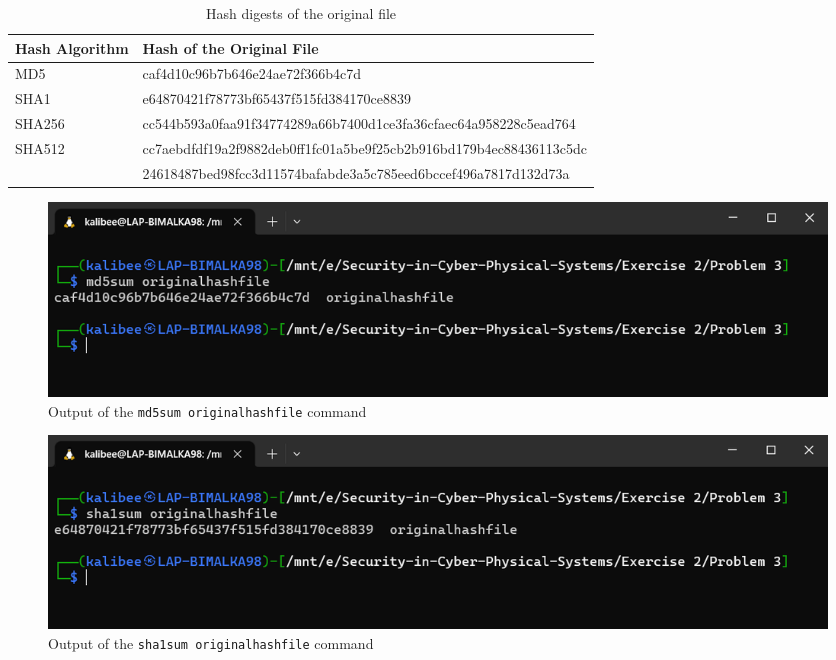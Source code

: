 \documentclass[11pt,letterpaper]{article}
\begin{document}
\begin{enumerate}
				
		
		\begin{table}[h!]
			\caption{Hash digests of the original file
			} \label{tab:hash-digest-originalhashfile}
			\begin{tabularx}{\columnwidth}{|p{4cm}|X|}
				\hline
				\textbf{Hash Algorithm} & \textbf{Hash of the Original File} \\
				\hline
				MD5 & caf4d10c96b7b646e24ae72f366b4c7d \\\hline
				
				\hline
				SHA1 & e64870421f78773bf65437f515fd384170ce8839 \\\hline
				
				\hline
				SHA256 & cc544b593a0faa91f34774289a66b7400d1ce3fa36cfaec64a958228c5ead764  \\ \hline
				
				\hline
				SHA512 & cc7aebdfdf19a2f9882deb0ff1fc01a5be9f25cb2b916bd179b4ec88436113c5dc\\ & 24618487bed98fcc3d11574bafabde3a5c785eed6bccef496a7817d132d73a \\ \hline
				
			\end{tabularx}
		\end{table}

		\begin{figure}[H]
			\centering
			\includegraphics[width=0.7\columnwidth]{images/p3/s3}
			\caption{Output of the {\tt md5sum originalhashfile} command} \label{fig:md5sum}
		\end{figure}
	
		\begin{figure}[H]
			\centering
			\includegraphics[width=0.7\columnwidth]{images/p3/s4}
			\caption{Output of the {\tt sha1sum originalhashfile} command} \label{fig:sha1sum}
		\end{figure}
	

\end{enumerate}
\end{document}
